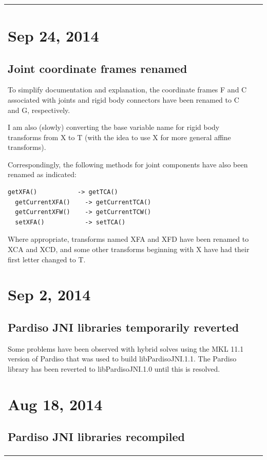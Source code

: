 \documentclass{article}
\begin{document}
\begin{tabular}{ll}
\section*{Sep 24, 2014}

\subsection*{Joint coordinate frames renamed}

To simplify documentation and explanation, the coordinate frames F and
C associated with joints and rigid body connectors have been renamed
to C and G, respectively.

I am also (slowly) converting the base variable name for rigid body
transforms from X to T (with the idea to use X for more general affine
transforms).

Correspondingly, the following methods for joint components have also
been renamed as indicated:
%
\begin{lstlisting}[]
  getXFA()           -> getTCA()
  getCurrentXFA()    -> getCurrentTCA()
  getCurrentXFW()    -> getCurrentTCW()
  setXFA()           -> setTCA()
\end{lstlisting}
%
Where appropriate, transforms named XFA and XFD have been renamed to
XCA and XCD, and some other transforms beginning with X have had their
first letter changed to T.

\section*{Sep 2, 2014}

\subsection*{Pardiso JNI libraries temporarily reverted}

Some problems have been observed with hybrid solves using the MKL 11.1
version of Pardiso that was used to build libPardisoJNI.1.1.  The
Pardiso library has been reverted to libPardisoJNI.1.0 until this is
resolved.

\section*{Aug 18, 2014}

\subsection*{Pardiso JNI libraries recompiled}


\end{tabular}
\end{document}
